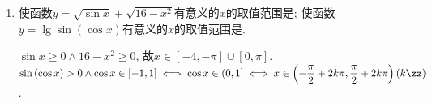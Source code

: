 \begin{enumerate}
\begin{jieda}
\begin{enumerate}
            $tan^2\alpha + cot^2\alpha = (tan\alpha - cot\alpha)^2 + 2tan\alpha \cdot cot\alpha = \dfrac{1}{16} + 2 = \dfrac{33}{16}$ \\
            $tan^3\alpha - cot^3\alpha = \dfrac{1}{4} \cdot \dfrac{49}{16} = \dfrac{49}{64}$
            \item $\dfrac{sin\alpha + cos\alpha}{sin\alpha - cos\alpha} = 2 \Longrightarrow \dfrac{tan\alpha + 1}{tan\alpha-1} = 2 \Longrightarrow tan\alpha = 3$
        \end{enumerate}
    \end{jieda}
    \item 使函数$y=\sqrt{\sin{x}}+\sqrt{16-x^2}$有意义的$x$的取值范围是\blkda[3]{$[-4,-\pi]\cup[0,\pi]$}; 
    使函数$y=\lg\sin\left(\cos{x}\right)$有意义的$x$的取值范围是. 
    \begin{jieda}
    $\sin{x}\geq 0\land 16-x^2\geq 0$, 故$x\in[-4,-\pi]\cup[0,\pi]$. \\
    $\sin\left(\cos{x}\right)>0\land\cos{x}\in[-1,1]\iff\cos{x}\in\left(0,1\right]\iff x\in\left(-\dfrac{\pi}{2}+2k\pi,\dfrac{\pi}{2}+2k\pi\right)\left(k\zz\right)$. 
    \end{jieda}
\end{enumerate}
